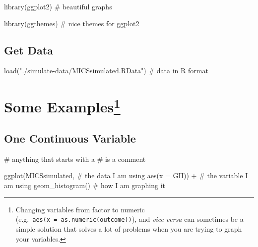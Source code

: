 \documentclass[
  letterpaper,
  DIV=11,
  numbers=noendperiod]{scrreprt}
\newenvironment{Shaded}{\begin{snugshade}}{\end{snugshade}}
\newcommand{\AttributeTok}[1]{\textcolor[rgb]{0.40,0.45,0.13}{#1}}
\newcommand{\CommentTok}[1]{\textcolor[rgb]{0.37,0.37,0.37}{#1}}
\newcommand{\FunctionTok}[1]{\textcolor[rgb]{0.28,0.35,0.67}{#1}}
\newcommand{\NormalTok}[1]{\textcolor[rgb]{0.00,0.23,0.31}{#1}}
\newcommand{\SpecialCharTok}[1]{\textcolor[rgb]{0.37,0.37,0.37}{#1}}
\newcommand{\StringTok}[1]{\textcolor[rgb]{0.13,0.47,0.30}{#1}}
\begin{document}
\begin{Shaded}
\begin{Highlighting}[]
\FunctionTok{library}\NormalTok{(ggplot2) }\CommentTok{\# beautiful graphs}

\FunctionTok{library}\NormalTok{(ggthemes) }\CommentTok{\# nice themes for ggplot2}
\end{Highlighting}
\end{Shaded}

\hypertarget{get-data-1}{%
\subsection{Get Data}\label{get-data-1}}

\begin{Shaded}
\begin{Highlighting}[]
\FunctionTok{load}\NormalTok{(}\StringTok{"./simulate{-}data/MICSsimulated.RData"}\NormalTok{) }\CommentTok{\# data in R format}
\end{Highlighting}
\end{Shaded}

\hypertarget{some-examplesvartype}{%
\section[Some Examples]{\texorpdfstring{Some
Examples\footnote{Changing variables from factor to numeric
  (e.g.~\texttt{aes(x\ =\ as.numeric(outcome))}), and \emph{vice versa}
  can sometimes be a simple solution that solves a lot of problems when
  you are trying to graph your variables.}}{Some Examples}}\label{some-examplesvartype}}

\hypertarget{one-continuous-variable}{%
\subsection{One Continuous Variable}\label{one-continuous-variable}}

\begin{Shaded}
\begin{Highlighting}[]
\CommentTok{\# anything that starts with a \textquotesingle{}\#\textquotesingle{} is a comment}

\FunctionTok{ggplot}\NormalTok{(MICSsimulated, }\CommentTok{\# the data I am using}
       \FunctionTok{aes}\NormalTok{(}\AttributeTok{x =}\NormalTok{ GII)) }\SpecialCharTok{+} \CommentTok{\# the variable I am using}
  \FunctionTok{geom\_histogram}\NormalTok{() }\CommentTok{\# how I am graphing it}
\end{Highlighting}
\end{Shaded}
\end{document}
